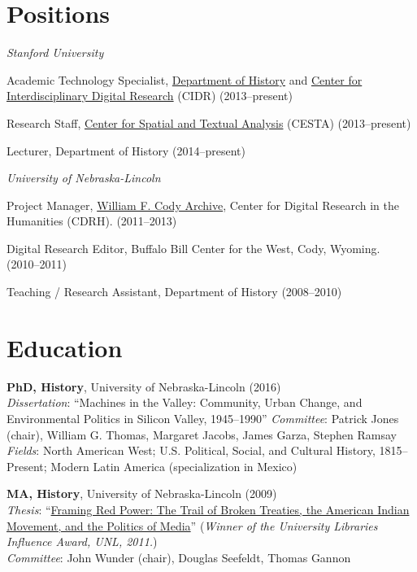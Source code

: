 \section{Positions}\label{positions}

\emph{Stanford University}

Academic Technology Specialist,
\href{http://history.stanford.edu}{Department of History} and
\href{http://library.stanford.edu/research/center-interdisciplinary-digital-research-cidr}{Center
for Interdisciplinary Digital Research} (CIDR) (2013--present)

Research Staff, \href{http://cesta.stanford.edu}{Center for Spatial and
Textual Analysis} (CESTA) (2013--present)

Lecturer, Department of History (2014--present)

\emph{University of Nebraska-Lincoln}

Project Manager, \href{http://codyarchive.org}{William F. Cody Archive},
Center for Digital Research in the Humanities (CDRH). (2011--2013)

Digital Research Editor, Buffalo Bill Center for the West, Cody,
Wyoming. (2010--2011)

Teaching / Research Assistant, Department of History (2008--2010)

\section{Education}\label{education}

\textbf{PhD, History}, University of Nebraska-Lincoln (2016)\\
\emph{Dissertation}: ``Machines in the Valley: Community, Urban Change,
and Environmental Politics in Silicon Valley, 1945--1990''
\emph{Committee}: Patrick Jones (chair), William G. Thomas, Margaret
Jacobs, James Garza, Stephen Ramsay\\
\emph{Fields}: North American West; U.S. Political, Social, and Cultural
History, 1815--Present; Modern Latin America (specialization in Mexico)

\textbf{MA, History}, University of Nebraska-Lincoln (2009)\\
\emph{Thesis}:
``\href{http://digitalcommons.unl.edu/historydiss/21/}{Framing Red
Power: The Trail of Broken Treaties, the American Indian Movement, and
the Politics of Media}'' (\emph{Winner of the University Libraries
Influence Award, UNL, 2011.})\\
\emph{Committee}: John Wunder (chair), Douglas Seefeldt, Thomas Gannon

